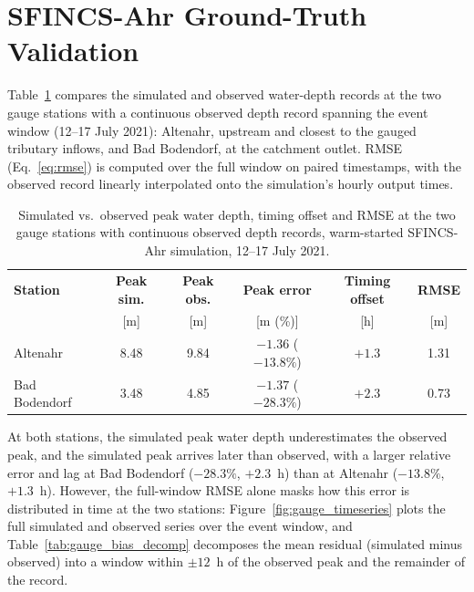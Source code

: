 \documentclass[12pt,a4paper]{report}
\begin{document}
{ 
\section{SFINCS-Ahr Ground-Truth Validation}
\label{sec:res_sfincs_validation}
 
Table~\ref{tab:gauge_validation} compares the simulated and observed water-depth
records at the two gauge stations with a continuous observed depth record spanning the
event window (12--17 July 2021): Altenahr, upstream and closest to the gauged tributary
inflows, and Bad Bodendorf, at the catchment outlet. RMSE (Eq.~\ref{eq:rmse}) is
computed over the full window on paired timestamps, with the observed record linearly
interpolated onto the simulation's hourly output times.
 
\begin{table}[H]
    \centering
    \caption{Simulated vs.\ observed peak water depth, timing offset and RMSE at
    the two gauge stations with continuous observed depth records, warm-started
    SFINCS-Ahr simulation, 12--17 July 2021.}
    \label{tab:gauge_validation}
    \begin{tabular}{lccccc}
        \toprule
        \textbf{Station} & \textbf{Peak sim.} & \textbf{Peak obs.} & \textbf{Peak error} & \textbf{Timing offset} & \textbf{RMSE} \\
         & [m] & [m] & [m (\%)] & [h] & [m] \\
        \midrule
        Altenahr       & 8.48 & 9.84 & $-1.36$ ($-13.8\%$) & $+1.3$ & 1.31 \\
        Bad Bodendorf  & 3.48 & 4.85 & $-1.37$ ($-28.3\%$) & $+2.3$ & 0.73 \\
        \bottomrule
    \end{tabular}
\end{table}
 
\noindent
At both stations, the simulated peak water depth underestimates the observed peak, and
the simulated peak arrives later than observed, with a larger
relative error and lag at Bad Bodendorf ($-28.3\%$, $+2.3$~h) than at Altenahr
($-13.8\%$, $+1.3$~h). However, the full-window RMSE alone masks how this
error is distributed in time at the two stations: Figure~\ref{fig:gauge_timeseries}
plots the full simulated and observed series over the event window, and
Table~\ref{tab:gauge_bias_decomp} decomposes the mean residual (simulated minus
observed) into a window within $\pm 12$~h of the observed peak and the remainder of the
record.
 
}
\end{document}
